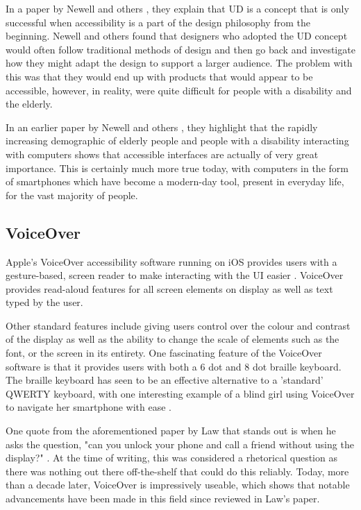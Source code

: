 In a paper by Newell and others \cite{incldesign}, they explain that UD is a concept that is only successful when accessibility is a part of the design philosophy from the beginning.
Newell and others found that designers who adopted the UD concept would often follow traditional methods of design and then go back and investigate how they might adapt the design to support a larger audience.
The problem with this was that they would end up with products that would appear to be accessible, however, in reality, were quite difficult for people with a disability and the elderly.

In an earlier paper by Newell and others \cite{computerinterface}, they highlight that the rapidly increasing demographic of elderly people and people with a disability interacting with computers shows that accessible interfaces are actually of very great importance.
This is certainly much more true today, with computers in the form of smartphones which have become a modern-day tool, present in everyday life, for the vast majority of people.


\subsection{VoiceOver}
Apple's VoiceOver accessibility software running on iOS provides users with a gesture-based, screen reader to make interacting with the UI easier \cite{iphone}.
VoiceOver provides read-aloud features for all screen elements on display as well as text typed by the user.

Other standard features include giving users control over the colour and contrast of the display as well as the ability to change the scale of elements such as the font, or the screen in its entirety.
One fascinating feature of the VoiceOver software is that it provides users with both a 6 dot and 8 dot braille keyboard. 
The braille keyboard has seen to be an effective alternative to a 'standard' QWERTY keyboard, with one interesting example of a blind girl using VoiceOver to navigate her smartphone with ease \cite{blind}. %

One quote from the aforementioned paper by Law that stands out is when he asks the question, "can you unlock your phone and call a friend without using the display?" \cite{cellphone}.
At the time of writing, this was considered a rhetorical question as there was nothing out there off-the-shelf that could do this reliably.
Today, more than a decade later, VoiceOver is impressively useable, which shows that notable advancements have been made in this field since reviewed in Law's paper.

